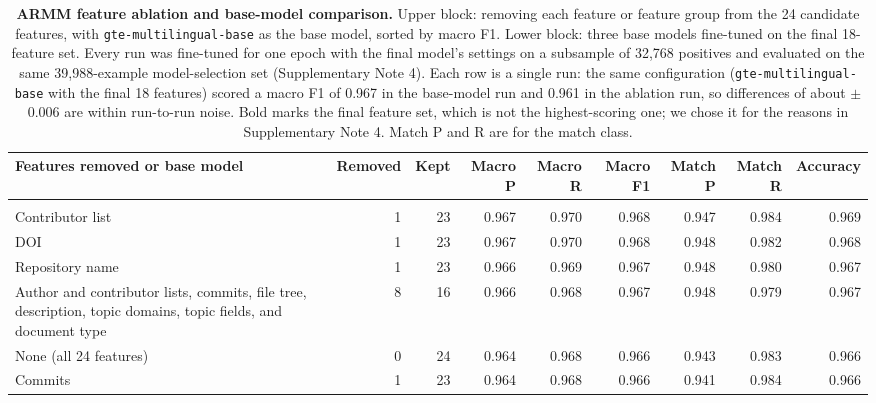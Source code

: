 \documentclass[pdflatex,sn-nature]{sn-jnl}%
\begin{document}
\begin{table}
\caption{\textbf{ARMM feature ablation and base-model comparison.} Upper block: removing each feature or feature group from the 24 candidate features, with \texttt{gte-multilingual-base} as the base model, sorted by macro F1. Lower block: three base models fine-tuned on the final 18-feature set. Every run was fine-tuned for one epoch with the final model's settings on a subsample of 32,768 positives and evaluated on the same 39,988-example model-selection set (Supplementary Note 4). Each row is a single run: the same configuration (\texttt{gte-multilingual-base} with the final 18 features) scored a macro F1 of 0.967 in the base-model run and 0.961 in the ablation run, so differences of about $\pm$0.006 are within run-to-run noise. Bold marks the final feature set, which is not the highest-scoring one; we chose it for the reasons in Supplementary Note 4. Match P and R are for the match class.}\label{stab:ablation}
\footnotesize
\setlength{\tabcolsep}{4pt}
\begin{tabular}{@{}>{\raggedright\arraybackslash}p{248pt}rrrrrrrr@{}}
\toprule
Features removed or base model & Removed & Kept & Macro P & Macro R & Macro F1 & Match P & Match R & Accuracy \\
\midrule
\multicolumn{9}{@{}l}{\textit{Feature ablation (\texttt{gte-multilingual-base})}}\\
\addlinespace[2pt]
Contributor list & 1 & 23 & 0.967 & 0.970 & 0.968 & 0.947 & 0.984 & 0.969 \\
DOI & 1 & 23 & 0.967 & 0.970 & 0.968 & 0.948 & 0.982 & 0.968 \\
Repository name & 1 & 23 & 0.966 & 0.969 & 0.967 & 0.948 & 0.980 & 0.967 \\
Author and contributor lists, commits, file tree, description, topic domains, topic fields, and document type & 8 & 16 & 0.966 & 0.968 & 0.967 & 0.948 & 0.979 & 0.967 \\
None (all 24 features) & 0 & 24 & 0.964 & 0.968 & 0.966 & 0.943 & 0.983 & 0.966 \\
Commits & 1 & 23 & 0.964 & 0.968 & 0.966 & 0.941 & 0.984 & 0.966 \\

\end{tabular}
\end{table}
\end{document}
